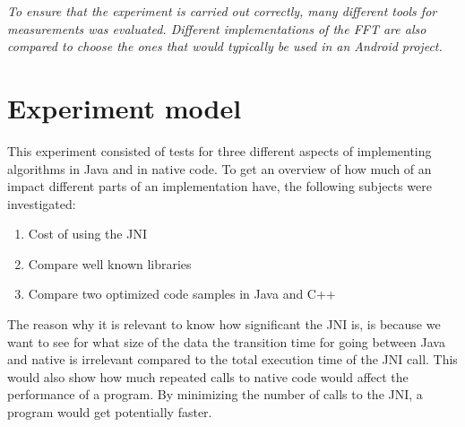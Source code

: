\textit{To ensure that the experiment is carried out correctly, many different tools for measurements was evaluated. Different implementations of the FFT are also compared to choose the ones that would typically be used in an Android project.}

\section{Experiment model}

This experiment consisted of tests for three different aspects of implementing algorithms in Java and in native code. To get an overview of how much of an impact different parts of an implementation have, the following subjects were investigated:

\begin{enumerate}
    \item Cost of using the JNI
    \item Compare well known libraries
    \item Compare two optimized code samples in Java and C++
\end{enumerate}

The reason why it is relevant to know how significant the JNI is, is because we want to see for what size of the data the transition time for going between Java and native is irrelevant compared to the total execution time of the JNI call. This would also show how much repeated calls to native code would affect the performance of a program. By minimizing the number of calls to the JNI, a program would get potentially faster.

